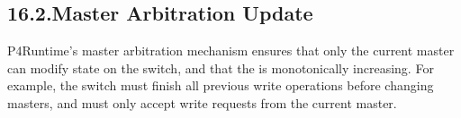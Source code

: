 \documentclass[11pt]{article}
\begin{document}
{%
\subsection{16.2.\hspace*{0.5em}Master Arbitration Update}\label{sec-master-arbitration-update}%

\noindent{}P4Runtime's master arbitration mechanism ensures that only the current master
can modify state on the switch, and that the  is monotonically
increasing. For example, the switch must finish all previous write operations
before changing masters, and must only accept write requests from the current
master.%

}
\end{document}
